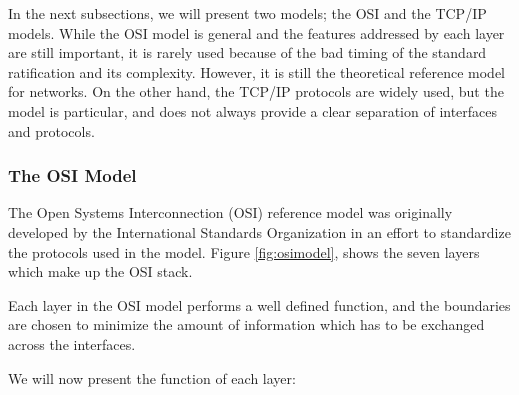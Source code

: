In the next subsections, we will present two models; the OSI and the TCP/IP models. While the OSI model is general and the features addressed by each layer are still important, it is rarely used because of the bad timing of the standard ratification and its complexity. However, it is still the theoretical reference model for networks. On the other hand, the TCP/IP protocols are widely used, but the model is particular, and does not always provide a clear separation of interfaces and protocols.                                                       
                     

\subsubsection{The OSI Model}

The Open Systems Interconnection (OSI) reference model was originally developed by the International Standards Organization in an effort to standardize the protocols used in the model. Figure \ref{fig:osimodel}, shows the seven layers which make up the OSI stack. 


Each layer in the OSI model performs a well defined function, and the boundaries are chosen to minimize the amount of information which has to be exchanged across the interfaces. 

We will now present the function of each layer:


